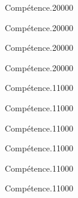 \begin{pageParcoursd}
\begin{ExoCdN}{Compétence.}{2}{0}{0}{0}{0}

\end{ExoCdN}

\begin{ExoCdN}{Compétence.}{2}{0}{0}{0}{0}

\end{ExoCdN}

\begin{ExoCdN}{Compétence.}{2}{0}{0}{0}{0}

\end{ExoCdN}

\begin{ExoCdN}{Compétence.}{2}{0}{0}{0}{0}

\end{ExoCdN}

\end{pageParcoursd} %


\begin{pageParcourst} %

\begin{ExoCtN}{Compétence.}{1}{1}{0}{0}{0}
 
\end{ExoCtN}

\begin{ExoCtN}{Compétence.}{1}{1}{0}{0}{0}
 
\end{ExoCtN}

\begin{ExoCtN}{Compétence.}{1}{1}{0}{0}{0}
 
\end{ExoCtN}

\begin{ExoCtN}{Compétence.}{1}{1}{0}{0}{0}
 
\end{ExoCtN}

\begin{ExoCtN}{Compétence.}{1}{1}{0}{0}{0}
 
\end{ExoCtN}

\begin{ExoCtN}{Compétence.}{1}{1}{0}{0}{0}
 
\end{ExoCtN}
 
\end{pageParcourst} %

